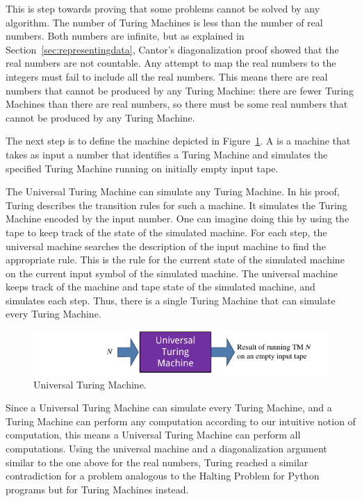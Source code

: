 \begin{schemeregion}
This is step towards proving that some problems cannot be solved by any algorithm.  The number of Turing Machines is less than the number of real numbers.  Both numbers are infinite, but as explained in Section~\ref{sec:representingdata}, Cantor's diagonalization proof showed that the real numbers are not countable.  Any attempt to map the real numbers to the integers must fail to include all the real numbers.  This means there are real numbers that cannot be produced by any Turing Machine: there are fewer Turing Machines than there are real numbers, so there must be some real numbers that cannot be produced by any Turing Machine.

The next step is to define the machine depicted in Figure~\ref{fig:universalmachine}.  A  is a machine that takes as input a number that identifies a Turing Machine and simulates the specified Turing Machine running on initially empty input tape.  

The Universal Turing Machine can simulate any Turing Machine.  In his proof, Turing describes the transition rules for such a machine.  It simulates the Turing Machine encoded by the input number.  One can imagine doing this by using the tape to keep track of the state of the simulated machine.  For each step, the universal machine searches the description of the input machine to find the appropriate rule.  This is the rule for the current state of the simulated machine on the current input symbol of the simulated machine.  The universal machine keeps track of the machine and tape state of the simulated machine, and simulates each step.  Thus, there is a single Turing Machine that can simulate every Turing Machine.

\begin{figure}[bt]
\begin{center}
\vspace*{1ex}
\includegraphics[width=4.8in]{figures/universal-machine.pdf}
\caption{Universal Turing Machine.}\label{fig:universalmachine}
\end{center}
\end{figure}

Since a Universal Turing Machine can simulate every Turing Machine, and a Turing Machine can perform any computation according to our intuitive notion of computation, this means a Universal Turing Machine can perform all computations.  Using the universal machine and a diagonalization argument similar to the one above for the real numbers, Turing reached a similar contradiction for a problem analogous to the Halting Problem for Python programs but for Turing Machines instead.


\end{schemeregion}
